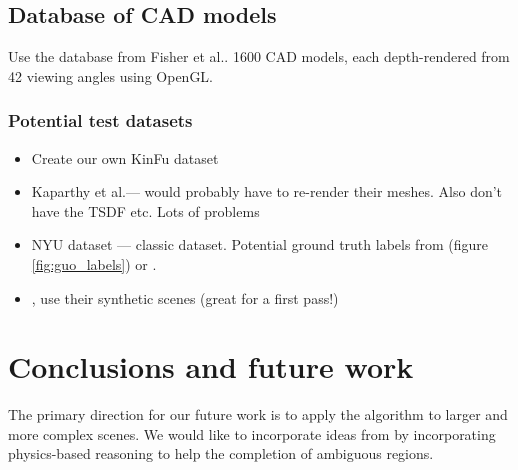 \documentclass[10pt,twocolumn,letterpaper]{article}
\makeatletter
\newcommand*{\ea}{et al.\@\xspace}
\makeatother
\begin{document}


\subsection{Database of CAD models}
Use the database from Fisher \ea \cite{fisher-siggraphasia-2012}.
1600 CAD models, each depth-rendered from 42 viewing angles using OpenGL.

\subsubsection{Potential test datasets}
\begin{itemize}
\item Create our own KinFu dataset
\item Kaparthy \ea --- would probably have to re-render their meshes.
Also don't have the TSDF etc. Lots of problems
\item NYU dataset --- classic dataset. Potential ground truth labels from \cite{guo-iccv-2013} (figure \ref{fig:guo_labels}) or \cite{kim-iccv-2013}.
\item \cite{fisher-siggraphasia-2012}, use their synthetic scenes (great for a first pass!)
\end{itemize}


\section{Conclusions and future work}


The primary direction for our future work is to apply the algorithm to larger and more complex scenes.
We would like to incorporate ideas from \cite{zheng-cvpr-2013, shao-siggraphasia-2014} by incorporating physics-based reasoning to help the completion of ambiguous regions.
\end{document}

